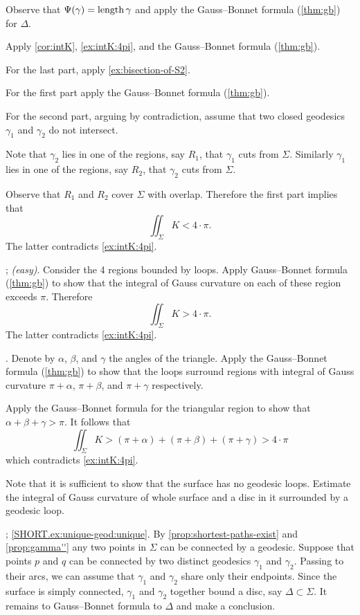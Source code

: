 Observe that $\Psi({\gamma})=\mathop{\rm length}\nolimits\gamma$ and apply  the Gauss--Bonnet formula (\ref{thm:gb}) for $\Delta$.

Apply \ref{cor:intK}, \ref{ex:intK:4pi}, and the Gauss--Bonnet formula (\ref{thm:gb}).

For the last part, apply \ref{ex:bisection-of-S2}.

 For the first part apply the Gauss--Bonnet formula (\ref{thm:gb}).

For the second part, arguing by contradiction, assume that two closed geodesics $\gamma_1$ and $\gamma_2$ do not intersect.

Note that $\gamma_2$ lies in one of the regions, say $R_1$, that $\gamma_1$ cuts  from $\Sigma$.
Similarly $\gamma_1$ lies in one of the regions, say $R_2$, that $\gamma_2$ cuts  from $\Sigma$.

Observe that $R_1$ and $R_2$ cover $\Sigma$ with overlap.
Therefore the first part implies that 
\[\iint_\Sigma K< 4\cdot\pi.\]
The latter contradicts \ref{ex:intK:4pi}.

\parbf{\ref{ex:self-intersections}}; \textit{(easy)}.
Consider the 4 regions bounded by loops.
Apply Gauss--Bonnet formula (\ref{thm:gb}) to show that the integral of Gauss curvature on each of these region exceeds $\pi$.
Therefore 
\[\iint_\Sigma K>4\cdot\pi.\]
The latter contradicts \ref{ex:intK:4pi}.

.
Denote by $\alpha$, $\beta$, and $\gamma$ the angles of the triangle.
Apply the Gauss--Bonnet formula (\ref{thm:gb}) to show that the loops surround regions with integral of Gauss curvature $\pi+\alpha$, $\pi+\beta$, and $\pi+\gamma$ respectively.

Apply the Gauss--Bonnet formula for the triangular region to show that $\alpha+\beta+\gamma>\pi$.
It follows that 
\[\iint_\Sigma K>(\pi+\alpha)+(\pi+\beta)+(\pi+\gamma)>4\cdot\pi\]
which contradicts \ref{ex:intK:4pi}.

 Note that it is sufficient to show that the surface has no geodesic loops.
Estimate the integral of Gauss curvature of whole surface and a disc in it surrounded by a geodesic loop.

\parbf{\ref{ex:unique-geod}}; \ref{SHORT.ex:unique-geod:unique}.
By \ref{prop:shortest-paths-exist} and \ref{prop:gamma''} any two points in $\Sigma$ can be connected by a geodesic.
Suppose that points $p$ and $q$ can be connected by two distinct geodesics $\gamma_1$ and $\gamma_2$.
Passing to their arcs, we can assume that $\gamma_1$ and $\gamma_2$ share only their endpoints.
Since the surface is simply connected, $\gamma_1$ and $\gamma_2$ together bound a disc, say $\Delta\subset\Sigma$.
It remains to Gauss--Bonnet formula to $\Delta$ and make a conclusion.
 
